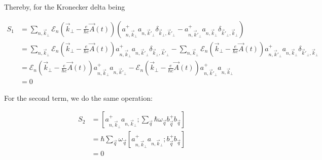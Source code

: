 \documentclass{article}
\begin{document}
Thereby, for the Kronecker delta being 

\begin{align}
    S_{1}
    &= \sum_{n,\vec{k}_{\perp}} \mathcal{E}_{n}\left(\vec{k}_{\perp} - \frac{e}{\hbar c} \vec{A}(t)\right) \left(a^{+}_{n,\vec{k}_{\perp}} a_{n,\vec{k}'_{\perp}} \delta_{\vec{k}_{\perp},\vec{k}'_{\perp}} - a^{+}_{n,\vec{k}'_{\perp}} a_{n,\vec{k}_{\perp}} \delta_{\vec{k}'_{\perp},\vec{k}_{\perp}}\right)\\
    & = \sum_{n,\vec{k}_{\perp}} \mathcal{E}_{n}\left(\vec{k}_{\perp} - \frac{e}{\hbar c} \vec{A}(t)\right) a^{+}_{n,\vec{k}_{\perp}} a_{n,\vec{k}'_{\perp}} \delta_{\vec{k}_{\perp},\vec{k}'_{\perp}} - \sum_{n,\vec{k}_{\perp}} \mathcal{E}_{n}\left(\vec{k}_{\perp} - \frac{e}{\hbar c} \vec{A}(t)\right) a^{+}_{n,\vec{k}'_{\perp}} a_{n,\vec{k}_{\perp}} \delta_{\vec{k}'_{\perp},\vec{k}_{\perp}}\\
    & = \mathcal{E}_{n}\left(\vec{k}_{\perp} - \frac{e}{\hbar c} \vec{A}(t)\right)a^{+}_{n,\vec{k}_{\perp}} a_{n,\vec{k}'_{\perp}} - \mathcal{E}_{n}\left(\vec{k}_{\perp} - \frac{e}{\hbar c} \vec{A}(t)\right) a^{+}_{n,\vec{k}'_{\perp}} a_{n,\vec{k}_{\perp}}\\
    & = 0
\end{align}

For the second term, we do the same operation:

\begin{align}
    S_{2} & = \left[ a^{+}_{n,\vec{k}_{\perp}}a_{n,\vec{k}_{\perp}} ; \sum_{\vec{q}} \hbar \omega_{\vec{q}} b^{+}_{\vec{q}}b_{\vec{q}} \right] \\
    & = \hbar \sum_{\vec{q}} \omega_{\vec{q}} \left[ a^{+}_{n,\vec{k}_{\perp}} a_{n,\vec{k}_{\perp}}; b^{+}_{\vec{q}}b_{\vec{q}} \right] \\
    & = 0
\end{align}
\end{document}
